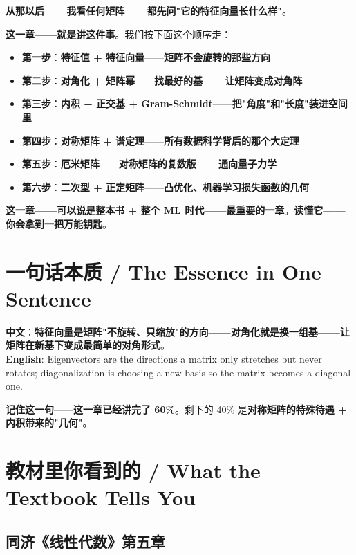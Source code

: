 \textbf{从那以后——我看任何矩阵——都先问"它的特征向量长什么样"}。

\textbf{这一章——就是讲这件事}。我们按下面这个顺序走：

\begin{itemize}
\item \textbf{第一步}：\textbf{特征值 + 特征向量}——\textbf{矩阵不会旋转的那些方向}
\item \textbf{第二步}：\textbf{对角化 + 矩阵幂}——\textbf{找最好的基——让矩阵变成对角阵}
\item \textbf{第三步}：\textbf{内积 + 正交基 + Gram-Schmidt}——\textbf{把"角度"和"长度"装进空间里}
\item \textbf{第四步}：\textbf{对称矩阵 + 谱定理}——\textbf{所有数据科学背后的那个大定理}
\item \textbf{第五步}：\textbf{厄米矩阵}——\textbf{对称矩阵的复数版——通向量子力学}
\item \textbf{第六步}：\textbf{二次型 + 正定矩阵}——\textbf{凸优化、机器学习损失函数的几何}
\end{itemize}

\textbf{这一章——可以说是整本书 + 整个 ML 时代——最重要的一章}。\textbf{读懂它——你会拿到一把万能钥匙}。

\section{一句话本质 / The Essence in One Sentence}

\begin{tcolorbox}[essbox={一句话本质}]
\textbf{中文}：\textbf{特征向量是矩阵"不旋转、只缩放"的方向——对角化就是换一组基——让矩阵在新基下变成最简单的对角形式}。\\[6pt]
\textbf{English}: Eigenvectors are the directions a matrix only stretches but never rotates; diagonalization is choosing a new basis so the matrix becomes a diagonal one.
\end{tcolorbox}

\textbf{记住这一句}——\textbf{这一章已经讲完了 60\%}。剩下的 40\% 是\textbf{对称矩阵的特殊待遇 + 内积带来的"几何"}。

\section{教材里你看到的 / What the Textbook Tells You}

\subsection{同济《线性代数》第五章}


